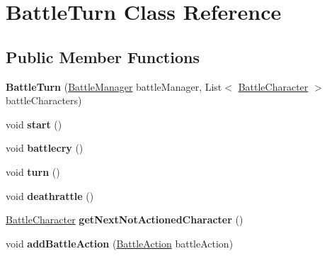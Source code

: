 \hypertarget{class_battle_turn}{}\section{Battle\+Turn Class Reference}
\label{class_battle_turn}
\subsection*{Public Member Functions}
\begin{DoxyCompactItemize}
\item 
{\bfseries Battle\+Turn} (\hyperlink{class_battle_manager}{Battle\+Manager} battle\+Manager, List$<$ \hyperlink{class_battle_character}{Battle\+Character} $>$ battle\+Characters)\hypertarget{class_battle_turn_a4bcd80508ea4f7cdfe4ad6c5f0c96f35}{}\label{class_battle_turn_a4bcd80508ea4f7cdfe4ad6c5f0c96f35}

\item 
void {\bfseries start} ()\hypertarget{class_battle_turn_a0675eea5650969e058239d0401968440}{}\label{class_battle_turn_a0675eea5650969e058239d0401968440}

\item 
void {\bfseries battlecry} ()\hypertarget{class_battle_turn_a76b99cd6751edf093862b9d7d44755da}{}\label{class_battle_turn_a76b99cd6751edf093862b9d7d44755da}

\item 
void {\bfseries turn} ()\hypertarget{class_battle_turn_af7be2babd82e25bac290acf4c73b09dd}{}\label{class_battle_turn_af7be2babd82e25bac290acf4c73b09dd}

\item 
void {\bfseries deathrattle} ()\hypertarget{class_battle_turn_a7261f58e71448d84fd38175668055518}{}\label{class_battle_turn_a7261f58e71448d84fd38175668055518}

\item 
\hyperlink{class_battle_character}{Battle\+Character} {\bfseries get\+Next\+Not\+Actioned\+Character} ()\hypertarget{class_battle_turn_ad857a017d508aa50355c52ace7039615}{}\label{class_battle_turn_ad857a017d508aa50355c52ace7039615}

\item 
void {\bfseries add\+Battle\+Action} (\hyperlink{class_battle_action}{Battle\+Action} battle\+Action)\hypertarget{class_battle_turn_ab8334eff5612c82871bf5a6d8a3d9770}{}\label{class_battle_turn_ab8334eff5612c82871bf5a6d8a3d9770}

\end{DoxyCompactItemize}
